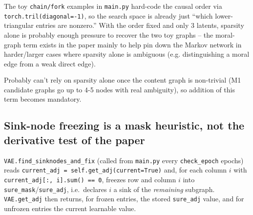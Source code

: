 \begin{itemize}
The toy \texttt{chain/fork} examples in \texttt{main.py} hard-code the causal order via \linebreak
\texttt{torch.tril(diagonal=-1)}, so the search space is already just ``which lower-triangular entries 
are nonzero.'' With the order fixed and only 3 latents, sparsity alone is probably enough pressure to 
recover the two toy graphs -- the moral-graph term exists in the paper mainly to help pin down the 
Markov network in harder/larger cases where sparsity alone is ambiguous (e.g. distinguishing a moral 
edge from a weak direct edge).

Probably can't rely on sparsity alone once the content graph is non-trivial (M1 candidate graphs go up 
to 4-5 nodes with real ambiguity), so addition of this term becomes mandatory.
\end{itemize}

\subsection{Sink-node freezing is a mask heuristic, not the derivative test of the paper}
\texttt{VAE.find\_sinknodes\_and\_fix} (called from \texttt{main.py} every \texttt{check\_epoch} epochs) reads
\texttt{current\_adj = self.get\_adj(current=True)} and, for each column $i$ with
\texttt{current\_adj[:, i].sum() == 0}, freezes row and column $i$ into \texttt{sure\_mask}/\texttt{sure\_adj},
i.e.\ declares $i$ a sink of the \emph{remaining} subgraph. \texttt{VAE.get\_adj} then returns, for frozen
entries, the stored \texttt{sure\_adj} value, and for unfrozen entries the current learnable value.

